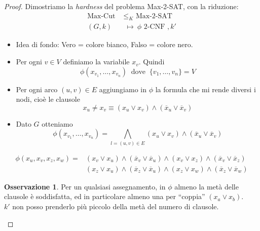 \documentclass[a4paper]{article}
\theoremstyle{definition}
\newtheorem{obs}{Osservazione}[subsection]
\begin{document}
			\begin{proof}
				Dimostriamo la \textit{hardness} del problema Max-2-SAT, con la riduzione:
				\begin{align*}
					 \text{Max-Cut }& \leq_K  \text{ Max-2-SAT} \\
					 (G, k) & \ \mapsto\ \phi \text{ 2-CNF }, k'
				\end{align*}
				\begin{itemize}
					\item Idea di fondo: Vero = colore bianco, Falso = colore nero.
					\item Per ogni $ v \in V $ definiamo la variabile $ x_v $. Quindi 
					\[
						\phi(x_{v_1}, \dots, x_{v_n}) \ \text{ dove } \ \{v_1, \dots, v_n \} = V
					\]
					\item Per ogni arco $ (u, v)\in E $ aggiungiamo in $ \phi $ la formula che mi rende diversi i nodi, cioè le clausole
					\[
						x_u \neq x_v \equiv (x_u\vee x_v)\wedge(\overline{x}_u\vee\overline{x}_v)
					\]
					\item Dato $ G $ otteniamo
					\[
						\phi(x_{v_1}, \dots, x_{v_n}) = \bigwedge\limits_{l = (u, v)\in E} (x_u\vee x_v)\wedge(\overline{x}_u\vee\overline{x}_v)
					\]
				\end{itemize}
				
				\begin{figure}[h!]
					\centering
				\end{figure}
				
				\begin{align*}
					\phi(x_u, x_v, x_z, x_w) = & (x_v\vee x_u)\wedge(\overline{x}_v\vee \overline{x}_u)\wedge(x_v\vee x_z)\wedge(\overline{x}_v\vee \overline{x}_z) \\
					& (x_z\vee x_u)\wedge(\overline{x}_z\vee \overline{x}_u)\wedge(x_z\vee x_w)\wedge(\overline{x}_z\vee \overline{x}_w)
				\end{align*}
				
				
				\begin{obs}
					Per un qualsiasi assegnamento, in $ \phi $ almeno la metà delle clausole è soddisfatta, ed in particolare almeno una per ``coppia'' $ (x_a\vee x_b) $.\\
					$ k' $ non posso prenderlo più piccolo della metà del numero di clausole.
				\end{obs}
				

\end{proof}
\end{document}
